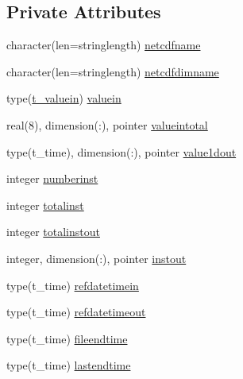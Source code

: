 \subsection*{Private Attributes}
\begin{DoxyCompactItemize}
\item 
character(len=stringlength) \mbox{\hyperlink{structmodulenetcdfcf__2__hdf5mohid_1_1t__date_af67052347b0f4d18030e997b860c2666}{netcdfname}}
\item 
character(len=stringlength) \mbox{\hyperlink{structmodulenetcdfcf__2__hdf5mohid_1_1t__date_a6fecf35c0d6d63aab5322dac8881276e}{netcdfdimname}}
\item 
type(\mbox{\hyperlink{structmodulenetcdfcf__2__hdf5mohid_1_1t__valuein}{t\+\_\+valuein}}) \mbox{\hyperlink{structmodulenetcdfcf__2__hdf5mohid_1_1t__date_a81b9d6de7c241df1618f66231df8beb6}{valuein}}
\item 
real(8), dimension(\+:), pointer \mbox{\hyperlink{structmodulenetcdfcf__2__hdf5mohid_1_1t__date_ac8f7a4000c39c91743f54b5059d693ea}{valueintotal}}
\item 
type(t\+\_\+time), dimension(\+:), pointer \mbox{\hyperlink{structmodulenetcdfcf__2__hdf5mohid_1_1t__date_ace09eb13271e7c515675998d3dce1dd2}{value1dout}}
\item 
integer \mbox{\hyperlink{structmodulenetcdfcf__2__hdf5mohid_1_1t__date_a27dccd69937c2e61de7105678ebaf5a5}{numberinst}}
\item 
integer \mbox{\hyperlink{structmodulenetcdfcf__2__hdf5mohid_1_1t__date_a59a75f9333ae2522fff41ddde78db6e0}{totalinst}}
\item 
integer \mbox{\hyperlink{structmodulenetcdfcf__2__hdf5mohid_1_1t__date_a54b51176d80b9ab79b36684699970548}{totalinstout}}
\item 
integer, dimension(\+:), pointer \mbox{\hyperlink{structmodulenetcdfcf__2__hdf5mohid_1_1t__date_ab8759b62f7b1125ae7fed077aab4972f}{instout}}
\item 
type(t\+\_\+time) \mbox{\hyperlink{structmodulenetcdfcf__2__hdf5mohid_1_1t__date_ad2d59c02fe2509bf9d60c7cf1f16c456}{refdatetimein}}
\item 
type(t\+\_\+time) \mbox{\hyperlink{structmodulenetcdfcf__2__hdf5mohid_1_1t__date_aaf5c217ad8b32f349fb14305cdc5ae7a}{refdatetimeout}}
\item 
type(t\+\_\+time) \mbox{\hyperlink{structmodulenetcdfcf__2__hdf5mohid_1_1t__date_a6dec5c4dc579df77919c2026c1f60674}{fileendtime}}
\item 
type(t\+\_\+time) \mbox{\hyperlink{structmodulenetcdfcf__2__hdf5mohid_1_1t__date_ae30ce210e110bcba88ddc6546a7f6245}{lastendtime}}

\end{DoxyCompactItemize}
